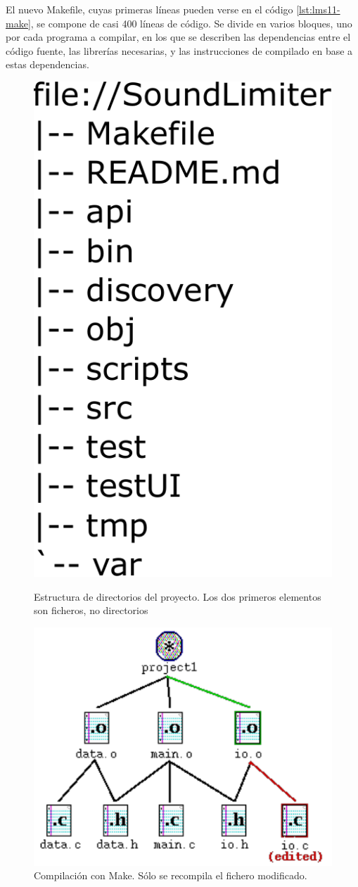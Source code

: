 El nuevo Makefile, cuyas primeras líneas pueden verse en el código \ref{lst:lms11-make}, se compone de casi 400 líneas de código. Se divide en varios bloques, uno por cada programa a compilar, en los que se describen las dependencias entre el código fuente, las librerías necesarias, y las instrucciones de compilado en base a estas dependencias.

\begin{figure}[h]
    \begin{minipage}{.45\textwidth}
        \centering
        \includegraphics[width=.45\textwidth]{figuras/lms11-files.pdf}
	    \caption[Estructura de directorios del proyecto]{Estructura de directorios del proyecto. Los dos primeros elementos son ficheros, no directorios}
	    \label{fig:lms11-files}
    \end{minipage}
    \hfill
    \begin{minipage}{.45\textwidth}
        \centering
        \includegraphics[width=1\textwidth]{figuras/make.pdf}
        \caption[Compilación con Make]{Compilación con Make. Sólo se recompila el fichero modificado.}
        \label{fig:make}
    \end{minipage}
\end{figure}

